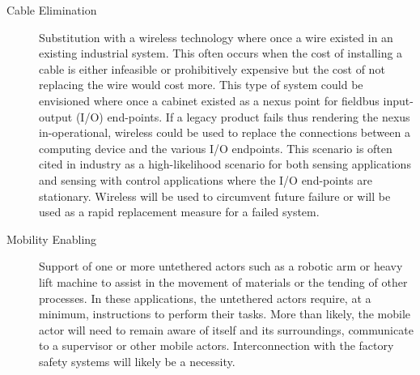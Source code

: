 {\begin{description}
	\item[Cable Elimination] Substitution with a wireless technology where once a wire existed in an existing industrial system.  This often occurs when the cost of installing a cable is either infeasible or prohibitively expensive but the cost of not replacing the wire would cost more.  This type of system could be envisioned where once a cabinet existed as a nexus point for fieldbus input-output (I/O) end-points.  If a legacy product fails thus rendering the nexus in-operational, wireless could be used to replace the connections between a computing device and the various I/O endpoints.  This scenario is often cited in industry as a high-likelihood scenario for both sensing applications and sensing with control applications where the I/O end-points are stationary.  Wireless will be used to circumvent future failure or will be used as a rapid replacement measure for a failed system.
	
	\item[Mobility Enabling] Support of one or more untethered actors such as a robotic arm or heavy lift machine to assist in the movement of materials or the tending of other processes.  In these applications, the untethered actors require, at a minimum, instructions to perform their tasks.  More than likely, the mobile actor will need to remain aware of itself and its surroundings, communicate to a supervisor or other mobile actors.  Interconnection with the factory safety systems will likely be a necessity.
	
\end{description}


}
